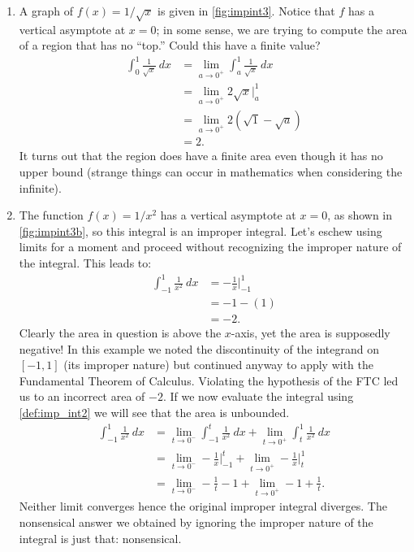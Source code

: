 {\begin{enumerate}
\item		A graph of $f(x) = 1/\sqrt{x}$ is given in \autoref{fig:impint3}.
Notice that $f$ has a vertical asymptote at $x=0$; in some sense, we are trying to compute the area of a region that has no ``top.'' Could this have a finite value? 
\begin{align*}
	\int_0^1 \frac{1}{\sqrt{x}}\ dx
	&= \lim_{a\to0^+}\int_a^1 \frac1{\sqrt{x}}\ dx \\
	&=	\lim_{a\to0^+} 2\sqrt{x}\Big|_a^1 \\
	&= \lim_{a\to0^+} 2\left(\sqrt{1}-\sqrt{a}\right)\\
	&=	2.
\end{align*}
It turns out that the region does have a finite area even though it has no upper bound (strange things can occur in mathematics when considering the infinite).

\item		The function $f(x) = 1/x^2$ has a vertical asymptote at $x=0$, as shown in \autoref{fig:impint3b}, so this integral is an improper integral. Let's eschew using limits for a moment and proceed without recognizing the improper nature of the integral. This leads to:
\begin{align*}
\int_{-1}^1\frac1{x^2}\ dx &= -\frac1x\Big|_{-1}^1\\
			&= -1 - (1)\\
			&=-2.
\end{align*}
Clearly the area in question is above the $x$-axis, yet the area is supposedly negative! In this example we noted the discontinuity of the integrand on $[-1,1]$ (its improper nature) but continued anyway to apply with the Fundamental Theorem of Calculus. Violating the hypothesis of the FTC led us to an incorrect area of $-2$. If we now evaluate the integral using \autoref{def:imp_int2} we will see that the area is unbounded.
\begin{align*}
	\int_{-1}^1\frac1{x^2}\ dx
	&= \lim_{t\to0^-}\int_{-1}^t \frac1{x^2}\ dx + \lim_{t\to0^+}\int_t^1\frac1{x^2}\ dx \\
	&= \lim_{t\to0^-}-\frac1x\Big|_{-1}^t + \lim_{t\to0^+}-\frac1x\Big|_t^1\\
	&= \lim_{t\to0^-}-\frac1t-1 + \lim_{t\to0^+} -1+\frac1t.
\end{align*}
Neither limit converges hence the original improper integral diverges. The nonsensical answer we obtained by ignoring the improper nature of the integral is just that: nonsensical.\eoehere
\end{enumerate}}

